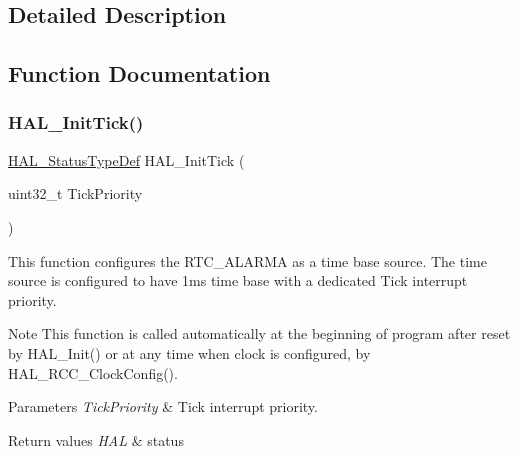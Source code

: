 \subsection{Detailed Description}


\subsection{Function Documentation}
\mbox{\label{group___h_a_l___time_base___r_t_c___alarm___template_ga879cdb21ef051eb81ec51c18147397d5}} 
\subsubsection{\texorpdfstring{H\+A\+L\+\_\+\+Init\+Tick()}{HAL\_InitTick()}}
{\footnotesize\ttfamily \hyperlink{stm32f0xx__hal__def_8h_a63c0679d1cb8b8c684fbb0632743478f}{H\+A\+L\+\_\+\+Status\+Type\+Def} H\+A\+L\+\_\+\+Init\+Tick (\begin{DoxyParamCaption}\item[{uint32\+\_\+t}]{Tick\+Priority }\end{DoxyParamCaption})}



This function configures the R\+T\+C\+\_\+\+A\+L\+A\+R\+MA as a time base source. The time source is configured to have 1ms time base with a dedicated Tick interrupt priority. 

\begin{DoxyNote}{Note}
This function is called automatically at the beginning of program after reset by H\+A\+L\+\_\+\+Init() or at any time when clock is configured, by H\+A\+L\+\_\+\+R\+C\+C\+\_\+\+Clock\+Config(). 
\end{DoxyNote}

\begin{DoxyParams}{Parameters}
{\em Tick\+Priority} & Tick interrupt priority. \\
\hline
\end{DoxyParams}

\begin{DoxyRetVals}{Return values}
{\em H\+AL} & status \\
\hline
\end{DoxyRetVals}
\mbox{\label{group___h_a_l___time_base___r_t_c___alarm___template_ga24e0ee9dae1ec0f9d19200f5575ff790}} 
